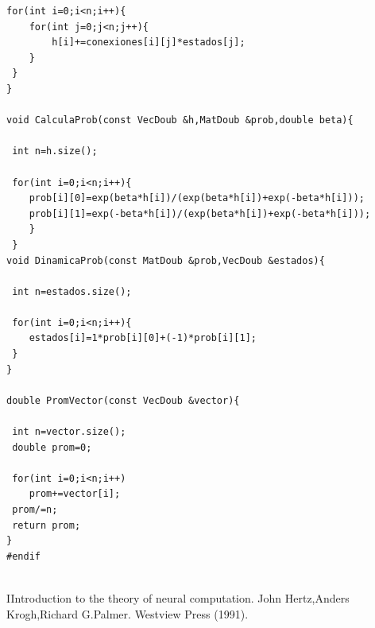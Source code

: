 \documentclass[aps,prb,onecolumn,10pt,floatfix,superscriptaddress]{article} %
\begin{document}
\begin{lstlisting}[frame=single,breaklines=true]
 for(int i=0;i<n;i++){
	for(int j=0;j<n;j++){
		h[i]+=conexiones[i][j]*estados[j];
	}
 }
}

void CalculaProb(const VecDoub &h,MatDoub &prob,double beta){
	
 int n=h.size();
	
 for(int i=0;i<n;i++){
	prob[i][0]=exp(beta*h[i])/(exp(beta*h[i])+exp(-beta*h[i]));
	prob[i][1]=exp(-beta*h[i])/(exp(beta*h[i])+exp(-beta*h[i]));		
	}
 }	
void DinamicaProb(const MatDoub &prob,VecDoub &estados){
	
 int n=estados.size();
	
 for(int i=0;i<n;i++){
	estados[i]=1*prob[i][0]+(-1)*prob[i][1];
 }
}

double PromVector(const VecDoub &vector){
	
 int n=vector.size();
 double prom=0;
	
 for(int i=0;i<n;i++)
	prom+=vector[i];
 prom/=n;
 return prom;
}
#endif


\end{lstlisting}


\begin{thebibliography}{99}

\bibitem IIntroduction to the theory of neural computation. John Hertz,Anders Krogh,Richard G.Palmer. Westview Press (1991).

\end{thebibliography}
\end{document}
